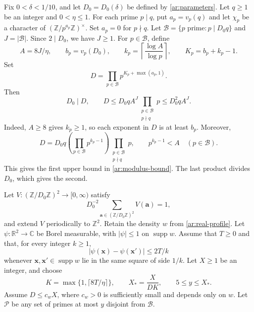 \documentclass[twoside]{aomart}
\theoremstyle{paperplain}
\theoremstyle{paperdefinition}
\newcommand{\Z}{\mathbb Z}
\newcommand{\R}{\mathbb R}
\newcommand{\C}{\mathbb C}
\numberwithin{equation}{section}
\begin{document}
Fix $0<\delta<1/10$, and let $D_0=D_0(\delta)$ be defined by
\eqref{ar:parameters}. Let $q\ge1$ be an integer and $0<\eta\le1$.
For each prime $p\mid q$, put $a_p=v_p(q)$ and let $\chi_p$ be a
character of $(\Z/p^{a_p}\Z)^\times$.
Set $a_p=0$ for $p\nmid q$.
Let $\mathcal B=\{p\text{ prime}:p\mid D_0q\}$ and $J=|\mathcal B|$.
Since $2\mid D_0$, we have $J\ge1$.
For $p\in\mathcal B$, define
\begin{equation*}
 A=8J/\eta,\qquad b_p=v_p(D_0),\qquad
 k_p=\left\lceil\frac{\log A}{\log p}\right\rceil,\qquad K_p=b_p+k_p-1.
\end{equation*}
Set
\begin{equation}
 D=\prod_{p\in\mathcal B}p^{K_p+\max(a_p,1)}.
 \label{ar:matching-modulus}
\end{equation}
Then
\begin{equation}
 D_0\mid D,\qquad
 D\le D_0qA^J
       \prod_{\substack{p\in\mathcal B\\p\nmid q}}p
 \le D_0^2qA^J.
 \label{ar:modulus-bound}
\end{equation}
Indeed, $A\ge8$ gives $k_p\ge1$, so each exponent in $D$ is
at least $b_p$. Moreover,
\begin{equation*}
 D=D_0q\left(\prod_{p\in\mathcal B}p^{k_p-1}\right)
          \prod_{\substack{p\in\mathcal B\\p\nmid q}}p,
 \qquad p^{k_p-1}<A\quad(p\in\mathcal B).
 \end{equation*}
This gives the first upper bound in \eqref{ar:modulus-bound}.
The last product divides $D_0$, which gives the second.

Let $V:(\Z/D_0\Z)^2\to[0,\infty)$ satisfy
\begin{equation*}
 D_0^{-2}\sum_{\mathbf a\in(\Z/D_0\Z)^2}V(\mathbf a)=1,
\end{equation*}
and extend $V$ periodically to $\Z^2$.
Retain the density $w$ from \eqref{ar:real-profile}.
Let $\psi:\R^2\to\C$ be Borel measurable, with
$|\psi|\le1$ on $\operatorname{supp}w$.
Assume that $T\ge0$ and that, for every integer $k\ge1$,
\begin{equation*}
 |\psi(\mathbf x)-\psi(\mathbf x')|\le 2T/k
\end{equation*}
whenever $\mathbf x,\mathbf x'\in\operatorname{supp}w$ lie
in the same square of side $1/k$.
Let $X\ge1$ be an integer, and choose
\begin{equation*}
 K=\max\{1,\lceil8T/\eta\rceil\},\qquad
 X_*=\frac X{DK},\qquad 5\le y\le X_*.
\end{equation*}
Assume $D\le c_wX$, where $c_w>0$ is sufficiently small and
depends only on $w$. Let $\mathcal P$ be any set of primes
at most $y$ disjoint from $\mathcal B$.
\end{document}
